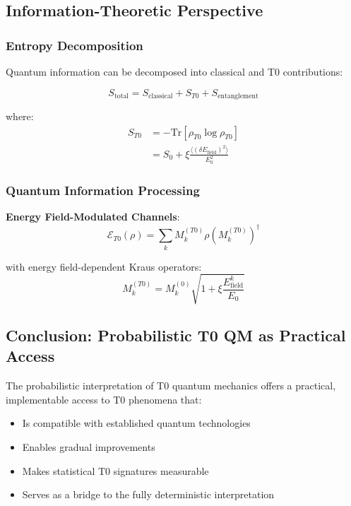 \documentclass[12pt,a4paper]{article}
\newcommand{\xipar}{\xi}
\theoremstyle{definition}
\theoremstyle{remark}
\begin{document}
\subsection{Information-Theoretic Perspective}

\subsubsection{Entropy Decomposition}

Quantum information can be decomposed into classical and T0 contributions:

\begin{equation}
	S_{\text{total}} = S_{\text{classical}} + S_{T0} + S_{\text{entanglement}}
	\label{eq:entropy_decomposition_en}
\end{equation}

where:
\begin{align}
	S_{T0} &= -\text{Tr}[\rho_{T0} \log \rho_{T0}] \\
	&= S_0 + \xipar \frac{\langle (\delta E_{\text{field}})^2 \rangle}{E_0^2}
\end{align}

\subsubsection{Quantum Information Processing}

\textbf{Energy Field-Modulated Channels}:
\begin{equation}
	\mathcal{E}_{T0}(\rho) = \sum_k M_k^{(T0)} \rho (M_k^{(T0)})^\dagger
	\label{eq:t0_quantum_channel_en}
\end{equation}

with energy field-dependent Kraus operators:
\begin{equation}
	M_k^{(T0)} = M_k^{(0)} \sqrt{1 + \xipar \frac{E_{\text{field}}^k}{E_0}}
	\label{eq:t0_kraus_operators_en}
\end{equation}

\subsection{Conclusion: Probabilistic T0 QM as Practical Access}

The probabilistic interpretation of T0 quantum mechanics offers a practical, implementable access to T0 phenomena that:

\begin{itemize}
	\item Is compatible with established quantum technologies
	\item Enables gradual improvements  
	\item Makes statistical T0 signatures measurable
	\item Serves as a bridge to the fully deterministic interpretation
\end{itemize}
\end{document}
